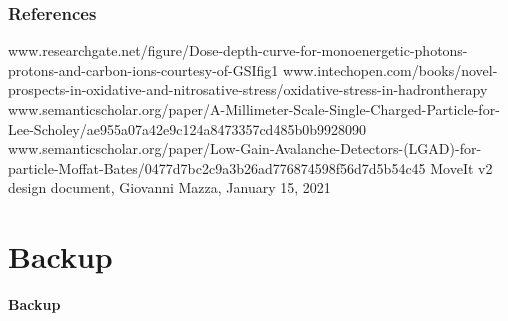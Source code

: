 \documentclass[aspectratio=169]{beamer}
\begin{document}
	\begin{frame}[noframenumbering]
	\frametitle{References}
	{\scriptsize 
	\begin{thebibliography}{00}
		www.researchgate.net/figure/Dose-depth-curve-for-monoenergetic-photons-protons-and-carbon-ions-courtesy-of-GSI\textunderscore fig1
		\newline
		www.intechopen.com/books/novel-prospects-in-oxidative-and-nitrosative-stress/oxidative-stress-in-hadrontherapy
		\newline
		www.semanticscholar.org/paper/A-Millimeter-Scale-Single-Charged-Particle-for-Lee-Scholey/ae955a07a42e9c124a8473357cd485b0b9928090
		\newline
		www.semanticscholar.org/paper/Low-Gain-Avalanche-Detectors-(LGAD)-for-particle-Moffat-Bates/0477d7bc2c9a3b26ad776874598f56d7d5b54c45
		\newline
		MoveIt v2 design document, Giovanni Mazza, January 15, 2021
	\end{thebibliography} }
	\end{frame}

	\section{Backup}
	
	\begin{frame}
	\begin{center}
		{\Huge {}\selectfont \color{blue} \textbf{Backup}}
	\end{center}
	\end{frame}
	
\end{document}
